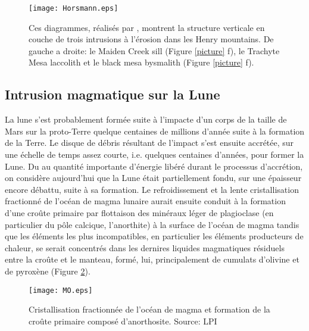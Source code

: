\begin{figure}[htpb]
  \begin{center}
    \graphicspath{ {/Users/thorey/Documents/These/Manuscript/Figure/Chapter1/} }
    \texttt{[image: Horsmann.eps]}
    \caption{Ces  diagrammes,  réalisés  par  \citet{Horsman:2009gea},
      montrent la structure verticale en  couche de trois intrusions à
      l'érosion  dans les  Henry  mountains. De  gauche  a droite:  le
      Maiden  Creek sill  (Figure \ref{picture}  f), le  Trachyte Mesa
      laccolith et le black mesa bysmalith (Figure \ref{picture} f).}
    \label{Horsmann}
  \end{center}
\end{figure}

\subsection{Intrusion magmatique sur la Lune}
\label{sec:moon}

La lune s'est  probablement formée suite à l'impacte d'un  corps de la
taille  de  Mars sur  la  proto-Terre  quelque centaines  de  millions
d'année  suite à  la  formation  de la  Terre.   Le  disque de  débris
résultant de l'impact s'est ensuite accrétée, sur une échelle de temps
assez  courte,  i.e.   quelques  centaines d'années,  pour  former  la
Lune. Du au  quantité importante d'énergie libéré  durant le processus
d'accrétion, on considère aujourd'hui  que la Lune était partiellement
fondu,  sur une  épaisseur encore  débattu, suite  à sa  formation. Le
refroidissement et  la lente cristallisation fractionné  de l'océan de
magma  lunaire aurait  ensuite  conduit à  la  formation d'une  croûte
primaire  par  flottaison  des   minéraux  léger  de  plagioclase  (en
particulier du pôle calcique, l'anorthite)  à la surface de l'océan de
magma tandis que  les éléments les plus  incompatibles, en particulier
les éléments  producteurs de  chaleur, se  serait concentrés  dans les
dernires liquides magmatiques résiduels entre la croûte et le manteau,
formé,  lui,  principalement  de  cumulats d'olivine  et  de  pyroxène
(Figure \ref{MO}).

\begin{figure}[htpb]
  \begin{center}
    \graphicspath{ {/Users/thorey/Documents/These/Manuscript/Figure/Chapter1/} }
    \texttt{[image: MO.eps]}
    \caption{Cristallisation  fractionnée  de   l'océan  de  magma  et
      formation de  la croûte primaire composé  d'anorthosite. Source:
      LPI}
    \label{MO}
  \end{center}
\end{figure}

